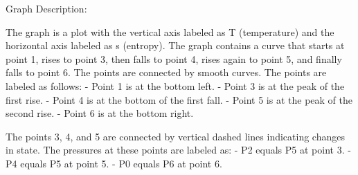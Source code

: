 Graph Description:

The graph is a plot with the vertical axis labeled as T (temperature) and the horizontal axis labeled as s (entropy). The graph contains a curve that starts at point 1, rises to point 3, then falls to point 4, rises again to point 5, and finally falls to point 6. The points are connected by smooth curves. The points are labeled as follows:
- Point 1 is at the bottom left.
- Point 3 is at the peak of the first rise.
- Point 4 is at the bottom of the first fall.
- Point 5 is at the peak of the second rise.
- Point 6 is at the bottom right.

The points 3, 4, and 5 are connected by vertical dashed lines indicating changes in state. The pressures at these points are labeled as:
- P2 equals P5 at point 3.
- P4 equals P5 at point 5.
- P0 equals P6 at point 6.